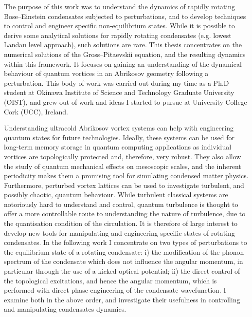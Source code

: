 
The purpose of this work was to understand the dynamics of rapidly rotating Bose--Einstein condensates subjected to perturbations, and to develop techniques to control and engineer specific non-equilibrium states. While it is possible to derive some analytical solutions for rapidly rotating condensates (e.g. lowest Landau level approach), such solutions are rare. This thesis concentrates on the numerical solutions of the Gross--Pitaevskii equation, and the resulting dynamics within this framework. It focuses on gaining an understanding of the dynamical behaviour of quantum vortices in an Abrikosov geometry following a perturbation. %
This body of work was carried out during my time as a Ph.D student at Okinawa Institute of Science and Technology Graduate University (OIST), and grew out of work and ideas I started to pursue at University College Cork (UCC), Ireland.

Understanding ultracold Abrikosov vortex systems can help with engineering quantum states for future technologies. Ideally, these systems can be used for long-term memory storage in quantum computing applications as individual vortices are topologically protected and, therefore, very robust. They also allow the study of quantum mechanical effects on mesoscopic scales, and the inherent periodicity makes them a promising tool for simulating condensed matter physics. Furthermore, perturbed vortex lattices can be used to investigate turbulent, and possibly chaotic, quantum behaviour. While turbulent classical systems are notoriously hard to understand and control, quantum turbulence is thought to offer a more controllable route to understanding the nature of turbulence, due to the quantisation condition of the circulation. It is therefore of large interest to develop new tools for manipulating and engineering specific states of rotating condensates. In the following work I concentrate on two types of perturbations to the equilibrium state of a rotating condensate: i) the modification of the phonon spectrum of the condensate which does not influence the angular momentum, in particular through the use of a kicked optical potential; ii) the direct control of the topological excitations, and hence the angular momentum, which is performed with direct phase engineering of the condensate wavefunction. I examine both in the above order, and investigate their usefulness in controlling and manipulating condensates dynamics.

